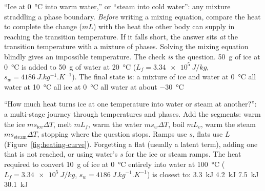 {``Ice at \SI{0}{\celsius} into warm water,'' or ``steam into cold water'': any mixture straddling a
phase boundary.}
{\emph{Before} writing a mixing equation, compare the heat to complete the change ($mL$) with the heat
the other body can supply in reaching the transition temperature. If it falls short, the answer sits
\emph{at} the transition temperature with a mixture of phases.}
{Solving the mixing equation blindly gives an impossible temperature. The check \emph{is} the question.}
{\SI{50}{g} of ice at \SI{0}{\celsius} is added to \SI{50}{g} of water at \SI{20}{\celsius}
($L_f=\SI{3.34e5}{J/kg}$, $s_w=\SI{4186}{J.kg^{-1}.K^{-1}}$). The final state is:}
{a mixture of ice and water at \SI{0}{\celsius}}
{all water at \SI{10}{\celsius}}
{all ice at \SI{0}{\celsius}}
{all water at about \SI{-30}{\celsius}}

{``How much heat turns ice at one temperature into water or steam at another?'': a multi-stage
journey through temperatures and phases.}
{Add the segments: warm the ice $ms_{\text{ice}}\Delta T$, melt $mL_f$, warm the water $ms_w\Delta T$,
boil $mL_v$, warm the steam $ms_{\text{steam}}\Delta T$, stopping where the question stops. Ramps use
$s$, flats use $L$ (Figure~\ref{fig:heating-curve}).}
{Forgetting a flat (usually a latent term), adding one that is not reached, or using water's $s$ for the
ice or steam ramps.}
{The heat required to convert \SI{10}{g} of ice at \SI{0}{\celsius} entirely into water at
\SI{100}{\celsius} ($L_f=\SI{3.34e5}{J/kg}$, $s_w=\SI{4186}{J.kg^{-1}.K^{-1}}$) is closest to:}
{\SI{3.3}{kJ}}
{\SI{4.2}{kJ}}
{\SI{7.5}{kJ}}
{\SI{30.1}{kJ}}

